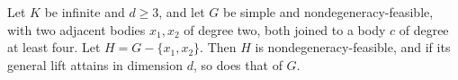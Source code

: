 \begin{lemma}
  \label{lem:pencil-d-lift-pendant-triangle}
  \leanok
  Let $K$ be infinite and $d \ge 3$, and let $G$ be simple and
  nondegeneracy-feasible, with two adjacent bodies $x_1, x_2$ of degree
  two, both joined to a body $c$ of degree at least four. Let
  $H = G - \{x_1, x_2\}$. Then $H$ is nondegeneracy-feasible, and if its
  general lift attains in dimension $d$, so does that of $G$.
\end{lemma}
